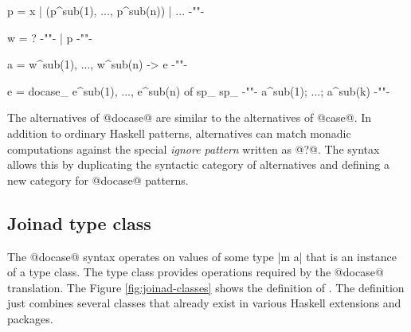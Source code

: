 \documentclass[preprint]{sigplanconf}
\begin{document}
\begin{code}
p  =  x | (p^sub(1), ..., p^sub(n)) | ...          {-""-}

w  =  ?                                            {-""-}
   |  p                                            {-""-}

a  =  w^sub(1), ..., w^sub(n) -> e                 {-""-}

e  =  docase_ e^sub(1), ..., e^sub(n) of  sp_ sp_  {-""-}
        a^sub(1); ...; a^sub(k)                    {-""-}
\end{code}
The alternatives of @docase@ are similar to the alternatives of @case@. In addition to ordinary 
Haskell patterns, alternatives can match monadic computations against the special 
\textit{ignore pattern} written as @?@. The syntax allows this by duplicating the syntactic
category of alternatives and defining a new category for @docase@ patterns.


\subsection{Joinad type class}
\label{sec:extension-typeclass}

The @docase@ syntax operates on values of some type |m a| that is an instance of a  
type class. The type class provides operations required by the @docase@ translation. The Figure 
\ref{fig:joinad-classes} shows the definition of . The definition just combines several 
classes that already exist in various Haskell extensions and packages. 
\end{document}
